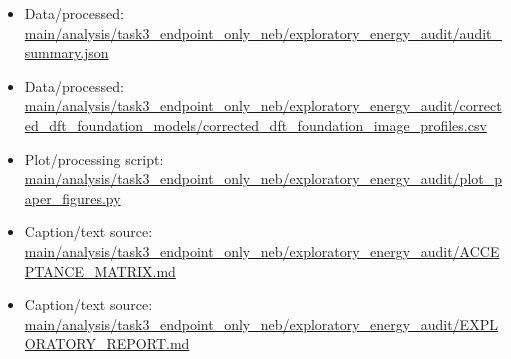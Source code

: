 \begin{itemize}[leftmargin=1.4em,noitemsep]
\item Data/processed: \begingroup\scriptsize\url{main/analysis/task3_endpoint_only_neb/exploratory_energy_audit/audit_summary.json}\endgroup
\item Data/processed: \begingroup\scriptsize\url{main/analysis/task3_endpoint_only_neb/exploratory_energy_audit/corrected_dft_foundation_models/corrected_dft_foundation_image_profiles.csv}\endgroup
\item Plot/processing script: \begingroup\scriptsize\url{main/analysis/task3_endpoint_only_neb/exploratory_energy_audit/plot_paper_figures.py}\endgroup
\item Caption/text source: \begingroup\scriptsize\url{main/analysis/task3_endpoint_only_neb/exploratory_energy_audit/ACCEPTANCE_MATRIX.md}\endgroup
\item Caption/text source: \begingroup\scriptsize\url{main/analysis/task3_endpoint_only_neb/exploratory_energy_audit/EXPLORATORY_REPORT.md}\endgroup
\end{itemize}
